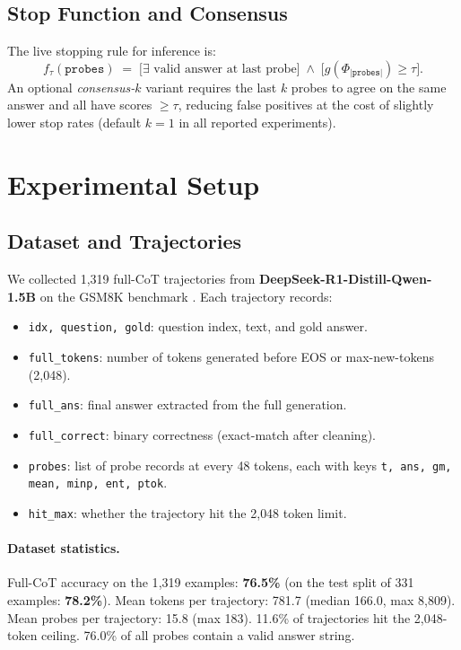 \documentclass[11pt]{article}
\begin{document}
\subsection{Stop Function and Consensus}

The live stopping rule for inference is:
\[
  f_{\tau}(\texttt{probes}) \;=\;
  \bigl[\exists \text{ valid answer at last probe}\bigr]
  \;\wedge\;
  \bigl[g(\Phi_{|\texttt{probes}|}) \ge \tau\bigr].
\]
An optional \emph{consensus-$k$} variant requires the last $k$ probes
to agree on the same answer and all have scores $\ge \tau$,
reducing false positives at the cost of slightly lower stop rates
(default $k=1$ in all reported experiments).

\section{Experimental Setup}
\label{sec:setup}

\subsection{Dataset and Trajectories}

We collected 1{,}319 full-CoT trajectories from
\textbf{DeepSeek-R1-Distill-Qwen-1.5B}
\citep{deepseek2025r1} on the GSM8K benchmark
\citep{cobbe2021gsm8k}.
Each trajectory records:
\begin{itemize}
  \item \texttt{idx, question, gold}: question index, text, and gold answer.
  \item \texttt{full\_tokens}: number of tokens generated before EOS or
        max-new-tokens (2{,}048).
  \item \texttt{full\_ans}: final answer extracted from the full generation.
  \item \texttt{full\_correct}: binary correctness (exact-match after cleaning).
  \item \texttt{probes}: list of probe records at every 48 tokens,
        each with keys \texttt{t, ans, gm, mean, minp, ent, ptok}.
  \item \texttt{hit\_max}: whether the trajectory hit the 2{,}048 token limit.
\end{itemize}

\paragraph{Dataset statistics.}
Full-CoT accuracy on the 1{,}319 examples: \textbf{76.5\%}
(on the test split of 331 examples: \textbf{78.2\%}).
Mean tokens per trajectory: 781.7 (median 166.0, max 8{,}809).
Mean probes per trajectory: 15.8 (max 183).
11.6\% of trajectories hit the 2{,}048-token ceiling.
76.0\% of all probes contain a valid answer string.
\end{document}
